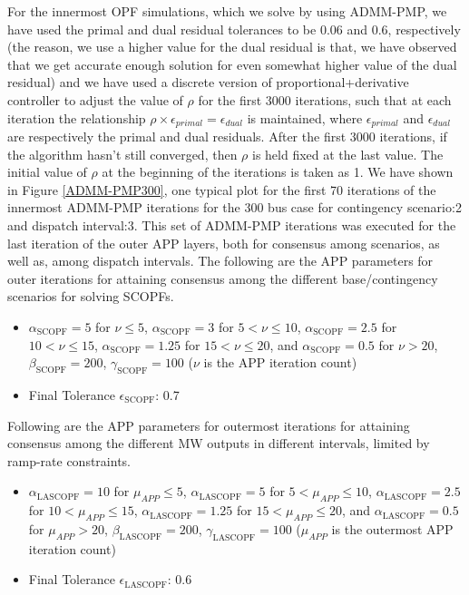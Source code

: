 \documentclass[preprint,12pt,3p]{elsarticle}
\begin{document}
For the innermost OPF simulations, which we solve by using ADMM-PMP, we have used the primal and dual residual tolerances to be 0.06 and 0.6, respectively (the reason, we use a higher value for the dual residual is that, we have observed that we get accurate enough solution for even somewhat higher value of the dual residual) and we have used a discrete version of proportional+derivative controller to adjust the value of $\rho$ for the first 3000 iterations, such that at each iteration the relationship $\rho\times\epsilon_{primal}=\epsilon_{dual}$ is maintained, where $\epsilon_{primal}$ and $\epsilon_{dual}$ are respectively the primal and dual residuals. After the first 3000 iterations, if the algorithm hasn't still converged, then $\rho$ is held fixed at the last value. The initial value of $\rho$ at the beginning of the iterations is taken as 1. We have shown in Figure \ref{ADMM-PMP300}, one typical plot for the first 70 iterations of the innermost ADMM-PMP iterations for the 300 bus case for contingency scenario:2 and dispatch interval:3. This set of ADMM-PMP iterations was executed for the last iteration of the outer APP layers, both for consensus among scenarios, as well as, among dispatch intervals. The following are the APP parameters for outer iterations for attaining consensus among the different base/contingency scenarios for solving SCOPFs.
\begin{itemize}
    \item $\alpha_{\text{SCOPF}}=5$ for $\nu\leq5$, $\alpha_{\text{SCOPF}}=3$ for $5<\nu\leq10$, $\alpha_{\text{SCOPF}}=2.5$ for $10<\nu\leq15$, $\alpha_{\text{SCOPF}}=1.25$ for $15<\nu\leq20$, and $\alpha_{\text{SCOPF}}=0.5$ for $\nu>20$, $\beta_{\text{SCOPF}}=200$, $\gamma_{\text{SCOPF}}=100$ ($\nu$ is the APP iteration count)
    \item Final Tolerance $\epsilon_{\text{SCOPF}}$: 0.7
\end{itemize}
Following are the APP parameters for outermost iterations for attaining consensus among the different MW outputs in different intervals, limited by ramp-rate constraints.
\begin{itemize}
    \item $\alpha_{\text{LASCOPF}}=10$ for $\mu_{APP}\leq5$, $\alpha_{\text{LASCOPF}}=5$ for $5<\mu_{APP}\leq10$, $\alpha_{\text{LASCOPF}}=2.5$ for $10<\mu_{APP}\leq15$, $\alpha_{\text{LASCOPF}}=1.25$ for $15<\mu_{APP}\leq20$, and $\alpha_{\text{LASCOPF}}=0.5$ for $\mu_{APP}>20$, $\beta_{\text{LASCOPF}}=200$, $\gamma_{\text{LASCOPF}}=100$ ($\mu_{APP}$ is the outermost APP iteration count)
    \item Final Tolerance $\epsilon_{\text{LASCOPF}}$: 0.6
\end{itemize}
\end{document}
